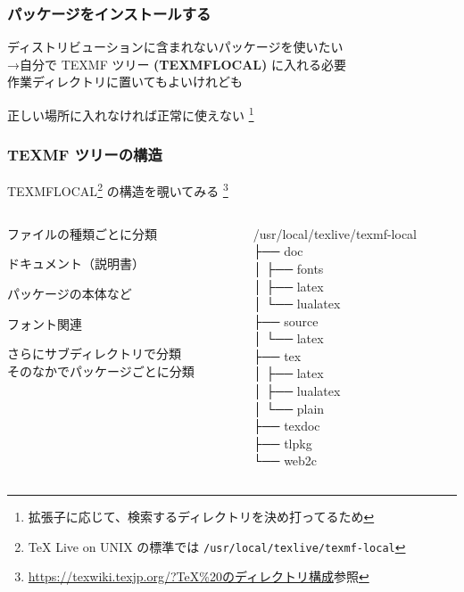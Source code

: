 \begin{frame}
	\frametitle{パッケージをインストールする}
	ディストリビューションに含まれないパッケージを使いたい\\
	→自分で TEXMF ツリー \textbf{(TEXMFLOCAL)} に入れる必要\\
	{\footnotesize 作業ディレクトリに置いてもよいけれども}
	
	正しい場所に入れなければ正常に使えない
	\footnote{拡張子に応じて、検索するディレクトリを決め打ってるため}
\end{frame}

\begin{frame}
	\frametitle{TEXMF ツリーの構造}
	TEXMFLOCAL\footnote{{\TeX} Live on UNIX の標準では \texttt{/usr/local/texlive/texmf-local}}
	の構造を覗いてみる
	\footnote{\href{https://texwiki.texjp.org/?TeX\%20\%E3\%81\%AE\%E3\%83\%87\%E3\%82\%A3\%E3\%83\%AC\%E3\%82\%AF\%E3\%83\%88\%E3\%83\%AA\%E6\%A7\%8B\%E6\%88\%90}
	{https://texwiki.texjp.org/?TeX\%20のディレクトリ構成}参照}\\
	
	\begin{columns}
		\begin{column}{0.6\textwidth}
			ファイルの種類ごとに分類
			\begin{description}
				\small
				\item[doc] ドキュメント（説明書）
				\item[tex] パッケージの本体など
				\item[font] フォント関連
			\end{description}
			さらにサブディレクトリで分類\\
			そのなかでパッケージごとに分類
		\end{column}
		\begin{column}{0.35\textwidth}
			\tiny\ttfamily
			/usr/local/texlive/texmf-local\\
			├── doc\\
			│   ├── fonts\\
			│   ├── latex\\
			│   └── lualatex\\
			├── source\\
			│   └── latex\\
			├── tex\\
			│   ├── latex\\
			│   ├── lualatex\\
			│   └── plain\\
			├── texdoc\\
			├── tlpkg\\
			└── web2c
		\end{column}
	\end{columns}
\end{frame}

